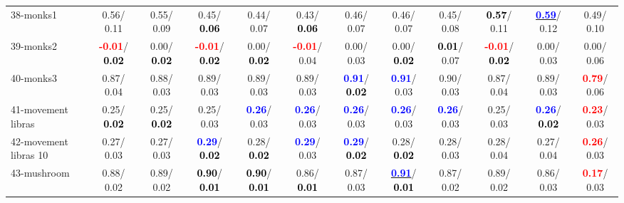 \begin{table}[h]
\begin{center}
{\begin{tabular}{lc|c|c|c|c|c|c|c|c|c|c}
38-monks1 &   0.56/  0.11 &   0.55/  0.09 &   0.45/\textcolor{black}{\textbf{  0.06}} &   0.44/  0.07 &   0.43/\textcolor{black}{\textbf{  0.06}} &   0.46/  0.07 &   0.46/  0.07 &   0.45/  0.08 & \textcolor{black}{\textbf{  0.57}}/  0.11 & \underline{\textcolor{blue}{\textbf{  0.59}}}/  0.12 &   0.49/  0.10 \\
39-monks2 & \textcolor{red}{\textbf{ -0.01}}/\textcolor{black}{\textbf{  0.02}} &   0.00/\textcolor{black}{\textbf{  0.02}} & \textcolor{red}{\textbf{ -0.01}}/\textcolor{black}{\textbf{  0.02}} &   0.00/\textcolor{black}{\textbf{  0.02}} & \textcolor{red}{\textbf{ -0.01}}/  0.04 &   0.00/  0.03 &   0.00/\textcolor{black}{\textbf{  0.02}} & \textcolor{black}{\textbf{  0.01}}/  0.07 & \textcolor{red}{\textbf{ -0.01}}/\textcolor{black}{\textbf{  0.02}} &   0.00/  0.03 &   0.00/  0.06 \\ \hline
40-monks3 &   0.87/  0.04 &   0.88/  0.03 &   0.89/  0.03 &   0.89/  0.03 &   0.89/  0.03 & \textcolor{blue}{\textbf{  0.91}}/\textcolor{black}{\textbf{  0.02}} & \textcolor{blue}{\textbf{  0.91}}/  0.03 &   0.90/  0.03 &   0.87/  0.04 &   0.89/  0.03 & \textcolor{red}{\textbf{  0.79}}/  0.06 \\
41-movement libras &   0.25/\textcolor{black}{\textbf{  0.02}} &   0.25/\textcolor{black}{\textbf{  0.02}} &   0.25/  0.03 & \textcolor{blue}{\textbf{  0.26}}/  0.03 & \textcolor{blue}{\textbf{  0.26}}/  0.03 & \textcolor{blue}{\textbf{  0.26}}/  0.03 & \textcolor{blue}{\textbf{  0.26}}/  0.03 & \textcolor{blue}{\textbf{  0.26}}/  0.03 &   0.25/  0.03 & \textcolor{blue}{\textbf{  0.26}}/\textcolor{black}{\textbf{  0.02}} & \textcolor{red}{\textbf{  0.23}}/  0.03 \\
42-movement libras 10 &   0.27/  0.03 &   0.27/  0.03 & \textcolor{blue}{\textbf{  0.29}}/\textcolor{black}{\textbf{  0.02}} &   0.28/\textcolor{black}{\textbf{  0.02}} & \textcolor{blue}{\textbf{  0.29}}/  0.03 & \textcolor{blue}{\textbf{  0.29}}/\textcolor{black}{\textbf{  0.02}} &   0.28/\textcolor{black}{\textbf{  0.02}} &   0.28/  0.03 &   0.28/  0.04 &   0.27/  0.04 & \textcolor{red}{\textbf{  0.26}}/  0.03 \\
43-mushroom &   0.88/  0.02 &   0.89/  0.02 & \textcolor{black}{\textbf{  0.90}}/\textcolor{black}{\textbf{  0.01}} & \textcolor{black}{\textbf{  0.90}}/\textcolor{black}{\textbf{  0.01}} &   0.86/\textcolor{black}{\textbf{  0.01}} &   0.87/  0.03 & \underline{\textcolor{blue}{\textbf{  0.91}}}/\textcolor{black}{\textbf{  0.01}} &   0.87/  0.02 &   0.89/  0.02 &   0.86/  0.03 & \textcolor{red}{\textbf{  0.17}}/  0.03 \\

\end{tabular}}
\end{center}
\end{table}
